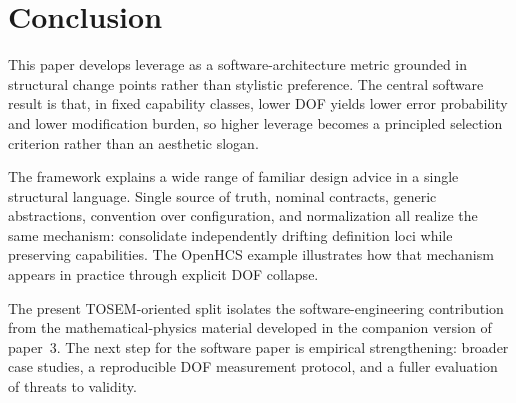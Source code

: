 \section{Conclusion}\label{conclusion}

This paper develops leverage as a software-architecture metric grounded in structural change points rather than stylistic preference. The central software result is that, in fixed capability classes, lower DOF yields lower error probability and lower modification burden, so higher leverage becomes a principled selection criterion rather than an aesthetic slogan.

The framework explains a wide range of familiar design advice in a single structural language. Single source of truth, nominal contracts, generic abstractions, convention over configuration, and normalization all realize the same mechanism: consolidate independently drifting definition loci while preserving capabilities. The OpenHCS example illustrates how that mechanism appears in practice through explicit DOF collapse.

The present TOSEM-oriented split isolates the software-engineering contribution from the mathematical-physics material developed in the companion version of paper~3. The next step for the software paper is empirical strengthening: broader case studies, a reproducible DOF measurement protocol, and a fuller evaluation of threats to validity.
